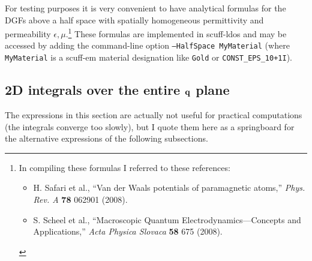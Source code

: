\documentclass[letterpaper]{article}
\begin{document}
For testing purposes it is very convenient to have
analytical formulas for the DGFs above a half space
with spatially homogeneous permittivity and permeability 
$\epsilon,\mu$.\footnote{In compiling these formulas I 
referred to these references:
\begin{itemize}
 \item H. Safari et al., ``Van der Waals potentials of 
       paramagnetic atoms,'' 
       \textit{Phys. Rev. A} \textbf{78} 062901 (2008).
 \item S. Scheel et al., 
       ``Macroscopic Quantum Electrodynamics---Concepts and 
       Applications,'' \textit{Acta Physica Slovaca} \textbf{58}
       675 (2008).
 \end{itemize}} 
These formulas are implemented in {\sc scuff-ldos} and
may be accessed by adding the command-line option
\texttt{--HalfSpace MyMaterial}
(where \texttt{MyMaterial} is a {\sc scuff-em} material
designation like \texttt{Gold} or \texttt{CONST\_EPS\_10+1I}).

\subsection{2D integrals over the entire $\mathbf{q}$ plane}

The expressions in this section are actually not useful
for practical computations (the integrals converge too 
slowly), but I quote them here as a springboard for the 
alternative expressions of the following subsections.
\end{document}
